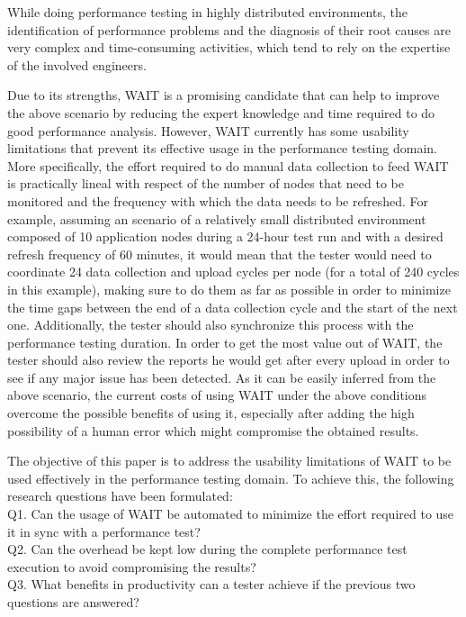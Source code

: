 \documentclass[runningheads,a4paper]{llncs}
\begin{document}
While doing performance testing in highly distributed environments, the
identification of performance problems and the diagnosis of their root causes are very complex and time-consuming
activities, which tend to rely on the expertise of the involved engineers.

Due to its strengths, WAIT is a promising candidate that can help to improve the
above scenario by reducing the expert knowledge and time required to do good
performance analysis. However, WAIT currently has some usability limitations
that prevent its effective usage in the performance testing domain. More
specifically, the effort required to do manual data collection to feed WAIT is
practically lineal with respect of the number of nodes that need to be monitored
and the frequency with which the data needs to be refreshed. For example,
assuming an scenario of a relatively small distributed environment composed
of 10 application nodes during a 24-hour test run and with a desired refresh
frequency of 60 minutes, it would mean that the tester would need to coordinate 
24 data collection and upload cycles per node (for a total of 240
cycles in this example), making sure to do them as far as possible in order to
minimize the time gaps between the end of a data collection cycle and the
start of the next one. Additionally, the tester should also synchronize this
process with the performance testing duration. In order to get the most value
out of WAIT, the tester should also review the reports he would get after every 
upload in order to see if any major issue has been detected. As it can be easily inferred from
the above scenario, the current costs of using WAIT under the above conditions
overcome the possible benefits of using it, especially after adding the high
possibility of a human error which might compromise the obtained results.

The objective of this paper is to address the usability limitations of WAIT to
be used effectively in the performance testing domain. To achieve this, the
following research questions have been formulated:
\\Q1. Can the usage of WAIT be automated to minimize the effort
required to use it in sync with a performance test?
\\Q2. Can the overhead be kept low during the complete performance test
execution to avoid compromising the results? 
\\Q3. What benefits in productivity can a tester achieve if the previous
two questions are answered?
\end{document}
